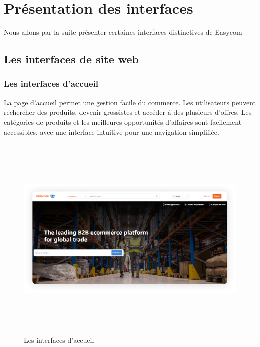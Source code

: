 \documentclass[edit,12pt,a4paper,ChapStyle,oneside,doubleinterligne]{report}
\begin{document}
\section{Présentation des interfaces }
Nous allons par la suite présenter certaines interfaces distinctives de Easycom
\subsection{Les interfaces de site web}
\subsubsection{Les interfaces d'accueil}
La page d'accueil permet une gestion facile du commerce. Les utilisateurs peuvent rechercher des produits, devenir grossistes et accéder à des plusieurs d'offres. Les catégories de produits et les meilleures opportunités d'affaires sont facilement accessibles, avec une interface intuitive pour une navigation simplifiée.
  \begin{figure} [H]
    \centering
    \includegraphics[width = 15.319375cm , height = 10cm , angle=360]{images/home 1.png}
    \caption{Les interfaces d'accueil}
    \label{fig:colors}
\end{figure}
\end{document}

